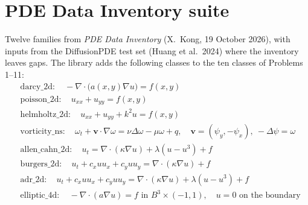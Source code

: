 \documentclass[11pt]{article}
\begin{document}
\section{PDE Data Inventory suite}

Twelve families from \emph{PDE Data Inventory} (X.~Kong, 19 October 2026), with inputs from the DiffusionPDE test
set (Huang et al.\ 2024) where the inventory leaves gaps. The library adds the following classes to the ten classes
of Problems 1--11:
\begin{align*}
&\text{darcy\_2d}:\quad -\nabla\cdot\bigl(a(x,y)\nabla u\bigr)=f(x,y)\\
&\text{poisson\_2d}:\quad u_{xx}+u_{yy}=f(x,y)\\
&\text{helmholtz\_2d}:\quad u_{xx}+u_{yy}+k^2u=f(x,y)\\
&\text{vorticity\_ns}:\quad \omega_t+\mathbf{v}\cdot\nabla\omega=\nu\Delta\omega-\mu\omega+q,\quad \mathbf{v}=(\psi_y,-\psi_x),\ -\Delta\psi=\omega\\
&\text{allen\_cahn\_2d}:\quad u_t=\nabla\cdot(\kappa\nabla u)+\lambda(u-u^3)+f\\
&\text{burgers\_2d}:\quad u_t+c_xuu_x+c_yuu_y=\nabla\cdot(\kappa\nabla u)+f\\
&\text{adr\_2d}:\quad u_t+c_xuu_x+c_yuu_y=\nabla\cdot(\kappa\nabla u)+\lambda(u-u^3)+f\\
&\text{elliptic\_4d}:\quad -\nabla\cdot(a\nabla u)=f \text{ in } B^3\times(-1,1),\quad u=0 \text{ on the boundary}
\end{align*}
\end{document}

